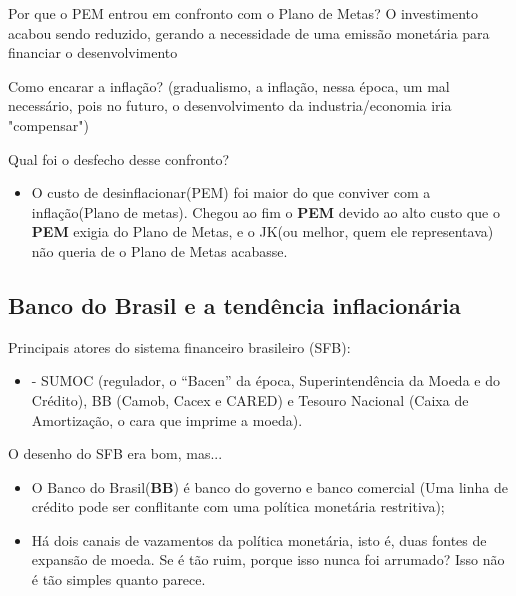 \documentclass[a4paper,12pt]{article}[abntex2]
\begin{document}
Por que o PEM entrou em confronto com o Plano de Metas? O investimento acabou sendo reduzido, gerando a necessidade de uma emissão monetária para financiar o desenvolvimento 

Como encarar a inflação? (gradualismo, a inflação, nessa época, um mal necessário, pois no futuro, o desenvolvimento da industria/economia iria "compensar")

Qual foi o desfecho desse confronto?\begin{itemize}
    \item O custo de desinflacionar(PEM) foi maior do que conviver com a inflação(Plano de metas). Chegou ao fim o \textbf{PEM} devido ao alto custo que o \textbf{PEM} exigia do Plano de Metas, e o JK(ou melhor, quem ele representava) não queria de o Plano de Metas acabasse.
\end{itemize}

\subsection{\textbf{Banco do Brasil e a tendência inflacionária}}
Principais atores do sistema financeiro brasileiro (SFB):\begin{itemize}
    \item - SUMOC (regulador, o “Bacen” da época, Superintendência da Moeda e do Crédito), BB (Camob, Cacex e CARED) e Tesouro Nacional (Caixa de Amortização, o cara que imprime a moeda).
\end{itemize}

O desenho do SFB era bom, mas...\begin{itemize}
    \item O Banco do Brasil(\textbf{BB}) é banco do governo e banco comercial (Uma linha de crédito pode ser conflitante com uma política monetária restritiva); 
    \item Há dois canais de vazamentos da política monetária, isto é, duas fontes de expansão de moeda. Se é tão ruim, porque isso nunca foi arrumado? Isso não é tão simples quanto parece.
\end{itemize}
\end{document}

